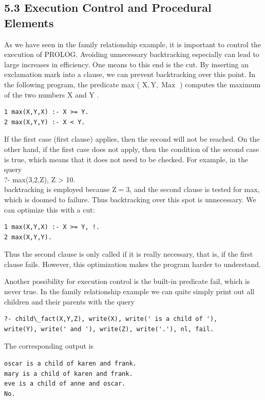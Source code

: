\documentclass[10pt]{book}
\begin{document}
\begin{center}
\subsection*{5.3 Execution Control and Procedural Elements}
As we have seen in the family relationship example, it is important to control the execution of PROLOG. Avoiding unnecessary backtracking especially can lead to large increases in efficiency. One means to this end is the cut. By inserting an exclamation mark into a clause, we can prevent backtracking over this point. In the following program, the predicate max ( $\mathrm{X}, \mathrm{Y}, \operatorname{Max}$ ) computes the maximum of the two numbers X and Y .

\begin{verbatim}
1 max(X,Y,X) :- X >= Y.
2 max(X,Y,Y) :- X < Y.
\end{verbatim}

If the first case (first clause) applies, then the second will not be reached. On the other hand, if the first case does not apply, then the condition of the second case is true, which means that it does not need to be checked. For example, in the query\\
?- max(3,2,Z), Z > 10.\\
backtracking is employed because $\mathrm{Z}=3$, and the second clause is tested for max, which is doomed to failure. Thus backtracking over this spot is unnecessary. We can optimize this with a cut:


\begin{verbatim}
1 max(X,Y,X) :- X >= Y, !.
2 max(X,Y,Y).
\end{verbatim}

Thus the second clause is only called if it is really necessary, that is, if the first clause fails. However, this optimization makes the program harder to understand.

Another possibility for execution control is the built-in predicate fail, which is never true. In the family relationship example we can quite simply print out all children and their parents with the query

\begin{verbatim}
?- child\_fact(X,Y,Z), write(X), write(' is a child of '),
write(Y), write(' and '), write(Z), write('.'), nl, fail.
\end{verbatim}

The corresponding output is

\begin{verbatim}
oscar is a child of karen and frank.
mary is a child of karen and frank.
eve is a child of anne and oscar.
No.
\end{verbatim}


\end{center}
\end{document}
